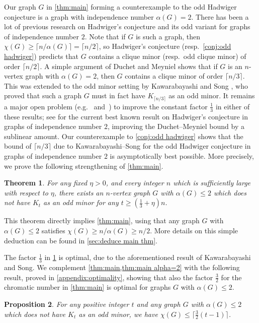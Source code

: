 \documentclass[11pt,reqno,oneside]{amsart}
\newtheorem{theorem}{Theorem}[section]
\newtheorem{proposition}[theorem]{Proposition}
\theoremstyle{definition}
\newcommand{\cei}[1]{\lceil #1 \rceil}
\newcommand\1{\mathbf{1}}
\let\leq\leqslant
\let\geq\geqslant
\begin{document}
Our graph $G$ in \cref{thm:main} forming a counterexample to the odd Hadwiger conjecture is a graph with independence number $\alpha(G)=2$. There has been a lot of previous research on Hadwiger's conjecture and its odd variant for graphs of independence number $2$. Note that if $G$ is such a graph, then $\chi(G)\geq \cei{n/\alpha(G)}=\cei{n/2}$, so Hadwiger's conjecture (resp.\ \cref{conj:odd hadwiger}) predicts that $G$ contains a clique minor (resp.\ odd clique minor) of order $\cei{n/2}$. A simple argument of Duchet and Meyniel \cite{MR671905} shows that if $G$ is an $n$-vertex graph with $\alpha(G)=2$, then $G$ contains a clique minor of order $\lceil n/3\rceil$. This was extended to the odd minor setting by Kawarabayashi and Song \cite{kawasong}, who proved that such a graph $G$ must in fact have $K_{\lceil n/3\rceil}$ as an odd minor.
It remains a major open problem (e.g.\ \cite[Open problem 4.8]{MR3526944} and~\cite{MR2674817,2512.17114}) to improve the constant factor $\frac 13$ in either of these results; see \cite[Section 4]{MR2735925} for the current best known result on Hadwiger's conjecture in graphs of independence number $2$, improving the Duchet--Meyniel bound by a sublinear amount. Our counterexample to \cref{conj:odd hadwiger} shows that the bound of $\lceil n/3\rceil$ due to Kawarabayashi--Song for the odd Hadwiger conjecture in graphs of independence number $2$ is asymptotically best possible. More precisely, we prove the following strengthening of \cref{thm:main}.

\begin{theorem}\label{thm:main alpha=2}
	For any fixed $\eta>0$, and every integer $n$ which is sufficiently large with respect to $\eta$, there exists an $n$-vertex graph $G$ with $\alpha(G)\leq 2$ which does not have $K_t$ as an odd minor for any $t\geq (\frac 13 + \eta)n$. 
\end{theorem}
This theorem directly implies \cref{thm:main}, using that any graph $G$ with $\alpha(G)\leq 2$ satisfies $\chi(G)\geq n/\alpha(G)\geq n/2$. More details on this simple deduction can be found in \cref{sec:deduce main thm}.

The factor $\frac 13$ in \cref{thm:main alpha=2} is optimal, due to the aforementioned result of Kawarabayashi and Song. We complement \cref{thm:main,thm:main alpha=2} with the following result, proved in \cref{appendix:optimality}, showing that also the factor $\frac 32$ for the chromatic number in \cref{thm:main} is optimal for graphs $G$ with $\alpha(G)\leq 2$.

\begin{proposition}\label{prop:stupid}
    For any positive integer $t$ and any graph $G$ with $\alpha(G)\leq 2$ which does not have $K_t$ as an odd minor, we have $\chi(G)\leq \lceil\frac{3}{2}(t-1)\rceil$. 
\end{proposition}
\end{document}
